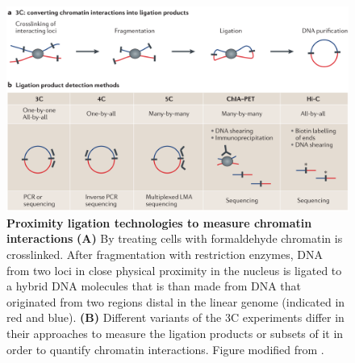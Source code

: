 \documentclass[a4paper,twoside=true,openright,parskip=full,chapterprefix=true,11pt,headings=normal,bibliography=totoc,listof=totoc,titlepage=on,captions=tableabove,draft=false]{scrreprt}
\theoremstyle{definition}
\theoremstyle{definition}
\theoremstyle{definition}
\theoremstyle{remark}
\begin{document}
\begin{figure}

{\centering \includegraphics[width=0.8\linewidth]{figures/Dekker2013_3C} 

}

\caption{\textbf{Proximity ligation technologies to
measure chromatin interactions} \textbf{(A)} By treating cells with
formaldehyde chromatin is crosslinked. After fragmentation with
restriction enzymes, DNA from two loci in close physical proximity in
the nucleus is ligated to a hybrid DNA molecules that is than made from
DNA that originated from two regions distal in the linear genome
(indicated in red and blue). \textbf{(B)} Different variants of the 3C
experiments differ in their approaches to measure the ligation products
or subsets of it in order to quantify chromatin interactions. Figure
modified from \citep{Dekker2013}.}\label{fig:ProximityLigation}
\end{figure}
\end{document}
